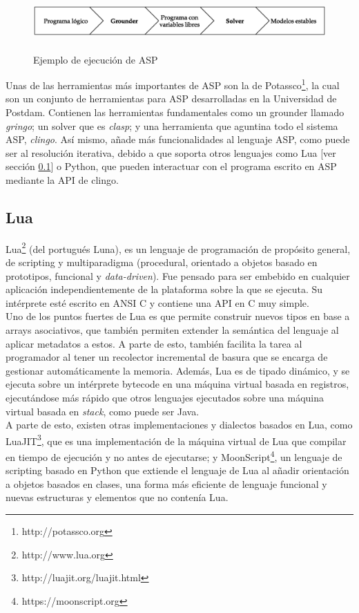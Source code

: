 \begin{figure}
	\centering
	\includegraphics[height=4em]{images/ASP}
	\label{fig:asp}
	\caption{Ejemplo de ejecución de ASP}
\end{figure}

Unas de las herramientas más importantes de ASP son la de Potassco\footnote{http://potassco.org}, la cual son un conjunto de herramientas para ASP desarrolladas en la Universidad de Postdam. Contienen las herramientas fundamentales como un grounder llamado \textit{gringo}; un solver que es \textit{clasp}; y una herramienta que aguntina todo el sistema ASP, \textit{clingo}. Así mismo, añade más funcionalidades al lenguaje ASP, como puede ser al resolución iterativa, debido a que soporta otros lenguajes como Lua [ver sección \ref{subsec:lua}] o Python, que pueden interactuar con el programa escrito en ASP mediante la API de clingo.

\subsection{Lua}\label{subsec:lua}

Lua\footnote{http://www.lua.org} \cite{Ierusalimschy:2016:PLF:3002843} (del portugués Luna), es un lenguaje de programación de propósito general, de scripting y multiparadigma (procedural, orientado a objetos basado en prototipos, funcional y \textit{data-driven}). Fue pensado para ser embebido en cualquier aplicación independientemente de la plataforma sobre la que se ejecuta. Su intérprete esté escrito en ANSI C y contiene una API en C muy simple. \\

Uno de los puntos fuertes de Lua es que permite construir nuevos tipos en base a arrays asociativos, que también permiten extender la semántica del lenguaje al aplicar metadatos a estos. A parte de esto, también facilita la tarea al programador al tener un recolector incremental de basura que se encarga de gestionar automáticamente la memoria. Además, Lua es de tipado dinámico, y se ejecuta sobre un intérprete bytecode en una máquina virtual basada en registros, ejecutándose más rápido que otros lenguajes ejecutados sobre una máquina virtual basada en \textit{stack}, como puede ser Java. \\

A parte de esto, existen otras implementaciones y dialectos basados en Lua, como LuaJIT\footnote{http://luajit.org/luajit.html}, que es una implementación de la máquina virtual de Lua que compilar en tiempo de ejecución y no antes de ejecutarse; y MoonScript\footnote{https://moonscript.org}, un lenguaje de scripting basado en Python que extiende el lenguaje de Lua al añadir orientación a objetos basados en clases, una forma más eficiente de lenguaje funcional y nuevas estructuras y elementos que no contenía Lua. \\

